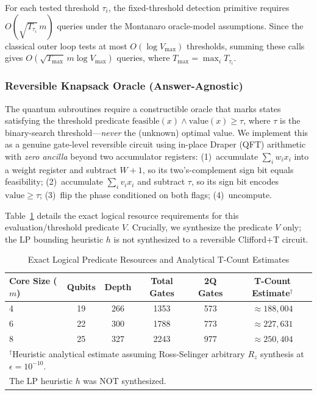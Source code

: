 \documentclass[conference]{IEEEtran} \IEEEoverridecommandlockouts
\begin{document}
For each tested threshold $\tau_i$, the fixed-threshold detection primitive requires $O(\sqrt{T_{\tau_i}}\,m)$ queries under the Montanaro oracle-model assumptions. Since the classical outer loop tests at most $O(\log V_{\max})$ thresholds, summing these calls gives $O(\sqrt{T_{\max}}\,m\log V_{\max})$ queries, where $T_{\max}=\max_i T_{\tau_i}$.

\subsubsection{Reversible Knapsack Oracle (Answer-Agnostic)}
\label{sec:oracle-impl}

The quantum subroutines require a constructible oracle that marks states satisfying the threshold predicate $\text{feasible}(x) \wedge \text{value}(x) \geq \tau$, where $\tau$ is the binary-search threshold---\textit{never} the (unknown) optimal value. We implement this as a genuine gate-level reversible circuit using in-place Draper (QFT) arithmetic with \textit{zero ancilla} beyond two accumulator registers: (1)~accumulate $\sum_i w_i x_i$ into a weight register and subtract $W{+}1$, so its two's-complement sign bit equals feasibility; (2)~accumulate $\sum_i v_i x_i$ and subtract $\tau$, so its sign bit encodes $\text{value} \geq \tau$; (3)~flip the phase conditioned on both flags; (4)~uncompute. 

Table~\ref{tab:oracle} details the exact logical resource requirements for this evaluation/threshold predicate $V$. Crucially, we synthesize the predicate $V$ only; the LP bounding heuristic $h$ is not synthesized to a reversible Clifford+T circuit. 

\begin{table}[htbp]
\caption{Exact Logical Predicate Resources and Analytical T-Count Estimates}
\label{tab:oracle}
\begin{center}
\footnotesize
\begin{tabular}{lccccc}
\toprule
\textbf{Core Size ($m$)} & \textbf{Qubits} & \textbf{Depth} & \textbf{Total Gates} & \textbf{2Q Gates} & \textbf{T-Count Estimate$^\dagger$} \\
\midrule
4 & 19 & 266 & 1353 & 573 & $\approx 188{,}004$ \\
6 & 22 & 300 & 1788 & 773 & $\approx 227{,}631$ \\
8 & 25 & 327 & 2243 & 977 & $\approx 250{,}404$ \\
\bottomrule
\multicolumn{6}{l}{\footnotesize $^\dagger$Heuristic analytical estimate assuming Ross-Selinger arbitrary $R_z$ synthesis at $\epsilon = 10^{-10}$.} \\
\multicolumn{6}{l}{\footnotesize The LP heuristic $h$ was NOT synthesized.}
\end{tabular}
\end{center}
\end{table}
\end{document}

